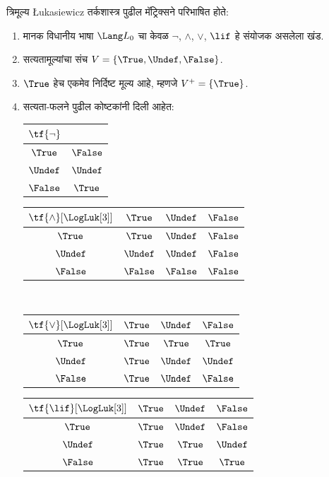 \documentclass[../../../include/open-logic-section]{subfiles}
\begin{document}
\begin{defn}
त्रिमूल्य \L ukasiewicz तर्कशास्त्र पुढील मॅट्रिक्सने परिभाषित होते:
\begin{enumerate}
  \item मानक विधानीय भाषा $\Lang L_0$ चा केवळ
  $\lnot$, $\land$, $\lor$, $\lif$ हे संयोजक असलेला खंड.
  \item सत्यतामूल्यांचा संच $V = \{\True, \Undef, \False\}$.
  \item $\True$ हेच एकमेव निर्दिष्ट मूल्य आहे, म्हणजे $V^+ = \{\True\}$.
  \item सत्यता-फलने पुढील कोष्टकांनी दिली आहेत:
  \begin{center}
    \begin{tabular}{c|c}
      $\tf{\lnot}$ & \\
      \hline
      $\True$ & $\False$ \\
      $\Undef$ & $\Undef$ \\
      $\False$ & $\True$
    \end{tabular}
    \quad
    \begin{tabular}{c|ccc}
      $\tf{\land}[\LogLuk[3]]$ & $\True$ & $\Undef$ & $\False$ \\
      \hline
      $\True$ & $\True$ & $\Undef$ & $\False$ \\
      $\Undef$ & $\Undef$ & $\Undef$ & $\False$\\
      $\False$ & $\False$ & $\False$ & $\False$
    \end{tabular}
    \\[2ex]
    \begin{tabular}{c|ccc}
      $\tf{\lor}[\LogLuk[3]]$ & $\True$ & $\Undef$ & $\False$ \\
      \hline
      $\True$ & $\True$ & $\True$ & $\True$ \\
      $\Undef$ & $\True$ & $\Undef$ & $\Undef$ \\
      $\False$ & $\True$ & $\Undef$ & $\False$
    \end{tabular}
    \quad
    \begin{tabular}{c|ccc}
      $\tf{\lif}[\LogLuk[3]]$ & $\True$ & $\Undef$ & $\False$ \\
      \hline
      $\True$ & $\True$ & $\Undef$ & $\False$ \\
      $\Undef$ & $\True$ & $\True$ & $\Undef$  \\
      $\False$ & $\True$ & $\True$ & $\True$
    \end{tabular}
  \end{center}
\end{enumerate}
\end{defn}
\end{document}
